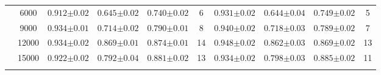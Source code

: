 \begin{table}[hbtp]
\begin{tabularx}{\textwidth}{cc | YYYc | YYYc }
        & 6000 & $0.912{\scriptscriptstyle\pm0.02}$ & $0.645{\scriptscriptstyle\pm0.02}$ & $0.740{\scriptscriptstyle\pm0.02}$ & 6 & $0.931{\scriptscriptstyle\pm0.02}$ & $0.644{\scriptscriptstyle\pm0.04}$ & $0.749{\scriptscriptstyle\pm0.02}$ & 5\\
        & 9000 & $0.934{\scriptscriptstyle\pm0.01}$ & $0.714{\scriptscriptstyle\pm0.02}$ & $0.790{\scriptscriptstyle\pm0.01}$ & 8 & $0.940{\scriptscriptstyle\pm0.02}$ & $0.718{\scriptscriptstyle\pm0.03}$ & $0.789{\scriptscriptstyle\pm0.02}$ & 7\\
        & 12000 & $0.934{\scriptscriptstyle\pm0.02}$ & $0.869{\scriptscriptstyle\pm0.01}$ & $0.874{\scriptscriptstyle\pm0.01}$ & 14 & $0.948{\scriptscriptstyle\pm0.02}$ & $0.862{\scriptscriptstyle\pm0.03}$ & $0.869{\scriptscriptstyle\pm0.02}$ & 13\\
        & 15000 & $0.922{\scriptscriptstyle\pm0.02}$ & $0.792{\scriptscriptstyle\pm0.04}$ & $0.881{\scriptscriptstyle\pm0.02}$ & 13 & $0.934{\scriptscriptstyle\pm0.02}$ & $0.798{\scriptscriptstyle\pm0.03}$ & $0.885{\scriptscriptstyle\pm0.02}$ & 11\\

    \end{tabularx}
\end{table}

